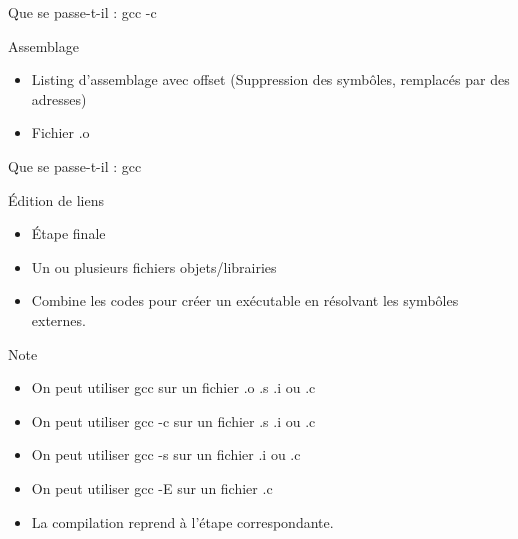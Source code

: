 \def\ftitle{Que se passe-t-il : gcc -c}
\begin{frame}[containsverbatim]{\ftitle}
\def\blocktitle{Assemblage}
\begin{block}{\blocktitle}
\begin{itemize}
\item Listing d'assemblage avec offset (Suppression des symbôles, remplacés par des adresses)
\item Fichier .o
\end{itemize}
\end{block}
\end{frame}


\def\ftitle{Que se passe-t-il : gcc}
\begin{frame}[containsverbatim]{\ftitle}
\def\blocktitle{Édition de liens}
\begin{block}{\blocktitle}
\begin{itemize}
\item Étape finale
\item Un ou plusieurs fichiers objets/librairies
\item Combine les codes pour créer un exécutable en résolvant les symbôles externes.
\end{itemize}
\end{block}
\def\blocktitle{Note}
\begin{alertblock}{\blocktitle}
\begin{itemize}
\item On peut utiliser gcc sur un fichier .o .s .i ou .c
\item On peut utiliser gcc -c sur un fichier .s .i ou .c
\item On peut utiliser gcc -s sur un fichier .i ou .c
\item On peut utiliser gcc -E sur un fichier .c
\item La compilation reprend à l'étape correspondante.
\end{itemize}
\end{alertblock}
\end{frame}


